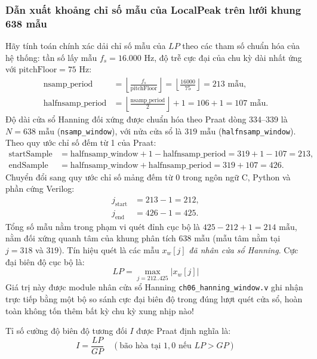 \subsubsection*{Dẫn xuất khoảng chỉ số mẫu của LocalPeak trên lưới khung 638 mẫu}
Hãy tính toán chính xác dải chỉ số mẫu của $LP$ theo các tham số chuẩn hóa của hệ thống: tần số lấy mẫu $f_s = 16.000\text{ Hz}$, độ trễ cực đại của chu kỳ dài nhất ứng với $\text{pitchFloor} = 75\text{ Hz}$:
\begin{align}
    \text{nsamp\_period} &= \left\lfloor \frac{f_s}{\text{pitchFloor}} \right\rfloor = \left\lfloor \frac{16000}{75} \right\rfloor = 213\text{ mẫu}, \\
    \text{halfnsamp\_period} &= \left\lfloor \frac{\text{nsamp\_period}}{2} \right\rfloor + 1 = 106 + 1 = 107\text{ mẫu}.
\end{align}
Độ dài cửa sổ Hanning đối xứng được chuẩn hóa theo Praat dòng 334--339 là $N = 638\text{ mẫu}$ (\texttt{nsamp\_window}), với nửa cửa sổ là $319\text{ mẫu}$ (\texttt{halfnsamp\_window}).
Theo quy ước chỉ số đếm từ 1 của Praat:
\begin{align}
    \text{startSample} &= \text{halfnsamp\_window} + 1 - \text{halfnsamp\_period} = 319 + 1 - 107 = 213, \\
    \text{endSample}   &= \text{halfnsamp\_window} + \text{halfnsamp\_period} = 319 + 107 = 426.
\end{align}
Chuyển đổi sang quy ước chỉ số mảng đếm từ 0 trong ngôn ngữ C, Python và phần cứng Verilog:
\begin{align}
    j_{\text{start}} &= 213 - 1 = 212, \\
    j_{\text{end}}   &= 426 - 1 = 425.
\end{align}
Tổng số mẫu nằm trong phạm vi quét đỉnh cục bộ là $425 - 212 + 1 = 214\text{ mẫu}$, nằm đối xứng quanh tâm của khung phân tích 638 mẫu (mẫu tâm nằm tại $j = 318$ và $319$). Tín hiệu quét là các mẫu $x_w[j]$ \emph{đã nhân cửa sổ Hanning}. Cực đại biên độ cục bộ là:
\begin{equation}
    LP = \max_{j = 212..425} |x_w[j]|
\end{equation}
Giá trị này được module nhân cửa sổ Hanning \texttt{ch06\_hanning\_window.v} ghi nhận trực tiếp bằng một bộ so sánh cực đại biên độ trong đúng lượt quét cửa sổ, hoàn toàn không tốn thêm bất kỳ chu kỳ xung nhịp nào!

Tỉ số cường độ biên độ tương đối $I$ được Praat định nghĩa là:
\begin{equation}
    I = \frac{LP}{GP} \quad (\text{bão hòa tại } 1{,}0 \text{ nếu } LP > GP)
\end{equation}

